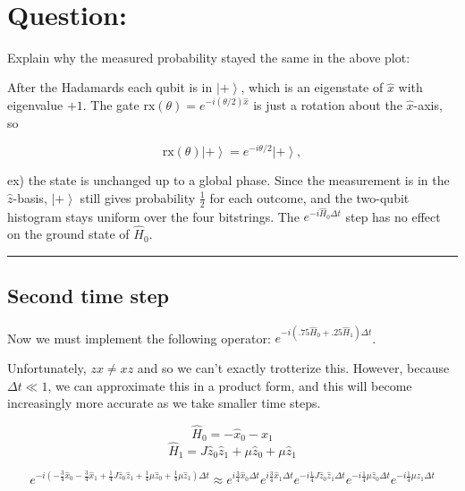 \documentclass[11pt]{article}
\newcommand{\prompt}[4]{
        {\ttfamily\llap{{\color{#2}[#3]:\hspace{3pt}#4}}\vspace{-\baselineskip}}
    }
\providecommand{\ket}[1]{\left|#1\right\rangle}
\begin{document}
            
\prompt{Out}{outcolor}{5}{}
    
    \begin{center}
    \end{center}
    { \hspace*{\fill} \\}
    

    \section{\texorpdfstring{\textbf{Question}:}{Question:}}\label{question}

Explain why the measured probability stayed the same in the above plot:

    After the Hadamards each qubit is in \(\ket{+}\), which is an eigenstate
of \(\hat{x}\) with eigenvalue \(+1\). The gate
\(\mathrm{rx}(\theta) = e^{-i(\theta/2)\hat{x}}\) is just a rotation
about the \(\hat{x}\)-axis, so

\[\mathrm{rx}(\theta)\ket{+} = e^{-i\theta/2}\ket{+},\]

ex) the state is unchanged up to a global phase. Since the measurement
is in the \(\hat{z}\)-basis, \(\ket{+}\) still gives probability
\(\tfrac{1}{2}\) for each outcome, and the two-qubit histogram stays
uniform over the four bitstrings. The \(e^{-i\hat{H}_0\Delta t}\) step
has no effect on the ground state of \(\hat{H}_0\).

    \begin{center}\rule{0.5\linewidth}{0.5pt}\end{center}

\subsection{Second time step}\label{second-time-step}

Now we must implement the following operator:
\(e^{-i\left(.75\hat{H}_0 + .25\hat{H}_1\right)\Delta t}\).

Unfortunately, \(zx \neq xz\) and so we can't exactly trotterize this.
However, because \(\Delta t \ll 1\), we can approximate this in a
product form, and this will become increasingly more accurate as we take
smaller time steps.

\[ \hat{H}_0 = - \hat{x}_0 - \hat{x}_1\]
\[ \hat{H}_1 = J\hat{z}_0\hat{z}_1 + \mu\hat{z}_0 + \mu\hat{z}_1\]

\[
e^{-i\left(- \tfrac{3}{4}\hat{x}_0 - \tfrac{3}{4}\hat{x}_1 + \tfrac{1}{4} J\hat{z}_0\hat{z}_1 + \tfrac{1}{4}\mu\hat{z}_0 + \tfrac{1}{4}\mu\hat{z}_1\right)\Delta t}
\approx
e^{i\tfrac{3}{4}\hat{x}_0\Delta t} 
e^{i\tfrac{3}{4}\hat{x}_1\Delta t}
e^{-i \tfrac{1}{4} J\hat{z}_0\hat{z}_1 \Delta t}
e^{-i \tfrac{1}{4} \mu\hat{z}_0 \Delta t}
e^{-i \tfrac{1}{4} \mu\hat{z}_1 \Delta t}
\]
\end{document}
